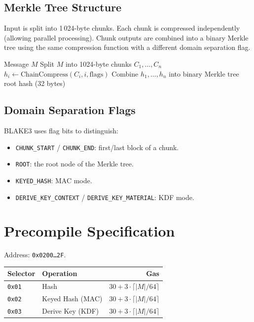 \documentclass[11pt,a4paper]{article}
\begin{document}
\subsection{Merkle Tree Structure}

Input is split into 1\,024-byte chunks. Each chunk is compressed independently
(allowing parallel processing). Chunk outputs are combined into a binary
Merkle tree using the same compression function with a different domain
separation flag.

\begin{algorithm}[H]
\caption{BLAKE3 hash (simplified)}
\begin{algorithmic}[1]
\Require Message $M$
\State Split $M$ into 1024-byte chunks $C_1, \ldots, C_n$
  \State $h_i \gets \text{ChainCompress}(C_i, i, \text{flags})$
\EndFor
\State Combine $h_1, \ldots, h_n$ into binary Merkle tree
\State \Return root hash (32 bytes)
\end{algorithmic}
\end{algorithm}

\subsection{Domain Separation Flags}

BLAKE3 uses flag bits to distinguish:
\begin{itemize}
  \item \texttt{CHUNK\_START} / \texttt{CHUNK\_END}: first/last block of a chunk.
  \item \texttt{ROOT}: the root node of the Merkle tree.
  \item \texttt{KEYED\_HASH}: MAC mode.
  \item \texttt{DERIVE\_KEY\_CONTEXT} / \texttt{DERIVE\_KEY\_MATERIAL}: KDF mode.
\end{itemize}

\section{Precompile Specification}

Address: \texttt{0x0200\ldots2F}.

\begin{table}[H]
\centering
\begin{tabular}{llr}
\toprule
\textbf{Selector} & \textbf{Operation} & \textbf{Gas} \\
\midrule
\texttt{0x01} & Hash & $30 + 3 \cdot \lceil |M| / 64 \rceil$ \\
\texttt{0x02} & Keyed Hash (MAC) & $30 + 3 \cdot \lceil |M| / 64 \rceil$ \\
\texttt{0x03} & Derive Key (KDF) & $30 + 3 \cdot \lceil |M| / 64 \rceil$ \\
\bottomrule
\end{tabular}
\end{table}
\end{document}
